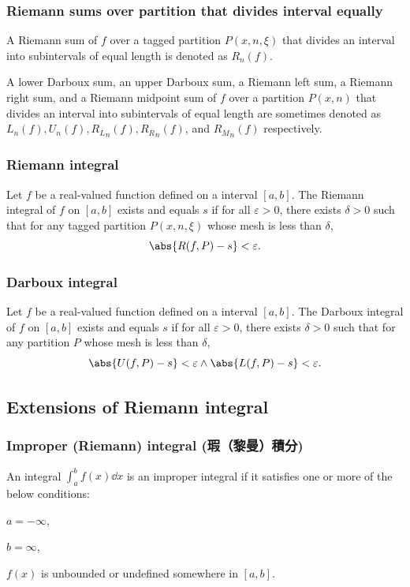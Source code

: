 \subsubsection{Riemann sums over partition that divides interval equally}
A Riemann sum of $f$ over a tagged partition $P(x,n,\xi)$ that divides an interval into subintervals of equal length is denoted as $R_n(f)$.

A lower Darboux sum, an upper Darboux sum, a Riemann left sum, a Riemann right sum, and a Riemann midpoint sum of $f$ over a partition $P(x,n)$ that divides an interval into subintervals of equal length are sometimes denoted as $L_n(f),U_n(f),{R_L}_n(f),{R_R}_n(f)$, and ${R_M}_n(f)$ respectively.
\subsubsection{Riemann integral}
Let $f$ be a real-valued function defined on a interval $[a,b]$. The Riemann integral of $f$ on $[a,b]$ exists and equals $s$ if for all $\varepsilon > 0$, there exists $\delta > 0$ such that for any tagged partition $P(x,n,\xi)$ whose mesh is less than $\delta$,
\[\abs{R(f,P)-s}<\varepsilon .\]
\subsubsection{Darboux integral}
Let $f$ be a real-valued function defined on a interval $[a,b]$. The Darboux integral of $f$ on $[a,b]$ exists and equals $s$ if for all $\varepsilon > 0$, there exists $\delta > 0$ such that for any partition $P$ whose mesh is less than $\delta$,
\[\abs{U(f,P)-s}<\varepsilon \land \abs{L(f,P)-s}<\varepsilon.\]
\subsection{Extensions of Riemann integral}
\subsubsection{Improper (Riemann) integral (瑕（黎曼）積分)}
An integral $\int _{a}^{b}f(x)\dd{x}$ is an improper integral if it satisfies one or more of the below conditions:
\ben
\item $a=-\infty$,
\item $b=\infty$,
\item $f(x)$ is unbounded or undefined somewhere in $[a,b]$.
\een

